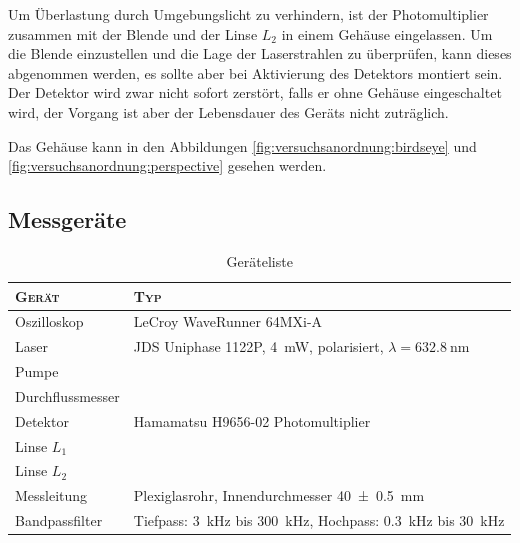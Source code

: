 Um \"Uberlastung  durch Umgebungslicht zu verhindern,  ist der Photomultiplier
zusammen mit der Blende und der Linse $L_2$ in einem Geh\"ause eingelassen. Um
die Blende einzustellen und die Lage der Laserstrahlen zu \"uberpr\"ufen, kann
dieses  abgenommen  werden,  es  sollte aber  bei  Aktivierung  des  Detektors
montiert sein. Der Detektor  wird zwar nicht sofort zerst\"ort,  falls er ohne
Geh\"ause  eingeschaltet  wird,  der  Vorgang ist  aber  der  Lebensdauer  des
Ger\"ats nicht zutr\"aglich.

Das Geh\"ause kann in den Abbildungen \ref{fig:versuchsanordnung:birdseye} und
\ref{fig:versuchsanordnung:perspective} gesehen werden.


\clearpage
\subsection{Messger\"ate}
\label{subsec:messgerate}

\begin{table}[h!t]
    \centering
    \caption{Ger\"ateliste}
    \begin{tabular}{ll}
        \toprule
        \textsc{Ger\"at}
        & \textsc{Typ}
        \\

        \midrule

        Oszilloskop
        & LeCroy WaveRunner 64MXi-A
        \\

        Laser
        & JDS Uniphase 1122P, \SI{4}{\milli\watt}, polarisiert, $\lambda = \SI{632,8}{\nano\meter}$
        \\

        Pumpe
        & %
        \\

        Durchflussmesser
        & %
        \\

        Detektor
        & Hamamatsu H9656-02 Photomultiplier
        \\

        Linse $L_1$
        & %
        \\

        Linse $L_2$
        & \\

        Messleitung
        & Plexiglasrohr, Innendurchmesser \SI{40 \pm 0.5}{\milli\meter}
        \\

        Bandpassfilter
        & Tiefpass: \SI{3}{\kilo\hertz} bis \SI{300}{\kilo\hertz}, Hochpass: \SI{0.3}{\kilo\hertz} bis \SI{30}{\kilo\hertz}
        \\

        \bottomrule
    \end{tabular}
\end{table}


